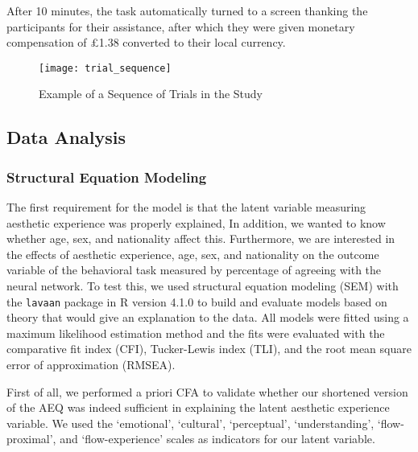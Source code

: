 \documentclass[../main.tex]{subfiles}
\begin{document}
	After 10 minutes, the task automatically turned to a screen thanking the participants for their assistance, after which they were given monetary compensation of £1.38 converted to their local currency.
	
	
	\begin{figure}
		\centering
		\caption{Example of a Sequence of Trials in the Study}
		\label{fig:trial_sequence}
		\texttt{[image: trial\_sequence]}
	\end{figure}

	
	\subsection{Data Analysis}
	\subsubsection{Structural Equation Modeling}
	The first requirement for the model is that the latent variable measuring aesthetic experience was properly explained, In addition, we wanted to know whether age, sex, and nationality affect this. Furthermore, we are interested in the effects of aesthetic experience, age, sex, and nationality on the outcome variable of the behavioral task measured by percentage of agreeing with the neural network. To test this, we used structural equation modeling (SEM) with the \texttt{lavaan} package \parencite{rosseel2012lavaan} in R version 4.1.0 \parencite{rcoreteamlanguage} to build and evaluate models based on theory that would give an explanation to the data. All models were fitted using a maximum likelihood estimation method and the fits were evaluated with the comparative fit index (CFI), Tucker-Lewis index (TLI), and the root mean square error of approximation (RMSEA).
	
	First of all, we performed a priori CFA to validate whether our shortened version of the AEQ was indeed sufficient in explaining the latent aesthetic experience variable. We used the `emotional', `cultural', `perceptual', `understanding', `flow-proximal', and `flow-experience' scales as indicators for our latent variable. 
	
\end{document}

